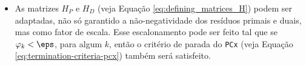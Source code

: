 \label{chap:final_remarks}






\begin{itemize}
 
    


\item As matrizes $H_P$ e $H_D$ (veja Equação
\eqref{eq:defining_matrices_H}) podem ser adaptadas, não só garantido a
não-negatividade dos resíduos primais e duais, mas como fator de escala.
Esse escalonamento pode ser feito tal que se
$\varphi_k<\eps$, para algum $k$, então o critério de parada do 
\texttt{PCx} (veja Equação \eqref{eq:termination-criteria-pcx}) também será
satisfeito.
\end{itemize}

